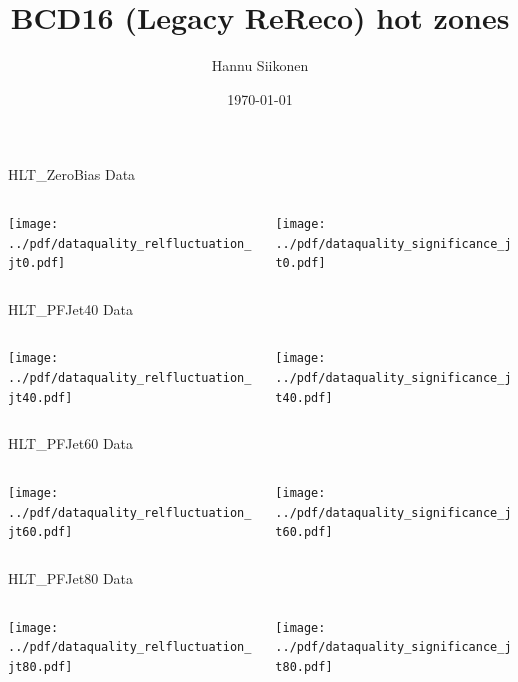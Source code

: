 \documentclass[9pt]{beamer}
\title[BCD16 (Legacy ReReco) hot zones]{BCD16 (Legacy ReReco) hot zones}
\author{Hannu Siikonen}
\institute{Helsinki Institute of Physics \\ \vspace{0.25cm} Instructor Adj.~Prof.~Mikko~Voutilainen}
\date{\today}
\begin{document}
\begin{frame}[t]
\titlepage
\end{frame}

\begin{frame}[t]{HLT\_ZeroBias Data}
\begin{columns}[T]
  \begin{column}{.5\textwidth}
  \texttt{[image: ../pdf/dataquality\_relfluctuation\_jt0.pdf]}
  \end{column}
  \begin{column}{.5\textwidth}
  \texttt{[image: ../pdf/dataquality\_significance\_jt0.pdf]}
  \end{column}
\end{columns}
\end{frame}

\begin{frame}[t]{HLT\_PFJet40 Data}
\begin{columns}[T]
  \begin{column}{.5\textwidth}
  \texttt{[image: ../pdf/dataquality\_relfluctuation\_jt40.pdf]}
  \end{column}
  \begin{column}{.5\textwidth}
  \texttt{[image: ../pdf/dataquality\_significance\_jt40.pdf]}
  \end{column}
\end{columns}
\end{frame}

\begin{frame}[t]{HLT\_PFJet60 Data}
\begin{columns}[T]
  \begin{column}{.5\textwidth}
  \texttt{[image: ../pdf/dataquality\_relfluctuation\_jt60.pdf]}
  \end{column}
  \begin{column}{.5\textwidth}
  \texttt{[image: ../pdf/dataquality\_significance\_jt60.pdf]}
  \end{column}
\end{columns}
\end{frame}

\begin{frame}[t]{HLT\_PFJet80 Data}
\begin{columns}[T]
  \begin{column}{.5\textwidth}
  \texttt{[image: ../pdf/dataquality\_relfluctuation\_jt80.pdf]}
  \end{column}
  \begin{column}{.5\textwidth}
  \texttt{[image: ../pdf/dataquality\_significance\_jt80.pdf]}
  \end{column}
\end{columns}
\end{frame}
\end{document}
